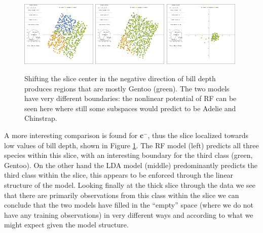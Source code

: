 \documentclass[]{interact}
\theoremstyle{plain}%
\theoremstyle{definition}
\theoremstyle{remark}
\begin{document}
\begin{figure}[ht]
\centerline{\includegraphics[width=0.32\textwidth]{figures/slice1_m_rf.png}
\includegraphics[width=0.32\textwidth]{figures/slice1_m_lda.png}
\includegraphics[width=0.32\textwidth]{figures/slice1_m_data.png}}
\caption{Shifting the slice center in the negative direction of bill depth produces regions that are mostly Gentoo (green). The two models have very different boundaries: the nonlinear potential of RF can be seen here where still some subspaces would predict to be Adelie and Chinstrap.}
\label{slice1m}
\end{figure}

A more interesting comparison is found for \(\mathbf{c}^{-}\), thus the
slice localized towards low values of bill depth, shown in Figure
\ref{slice1m}. The RF model (left) predicts all three species within
this slice, with an interesting boundary for the third class (green,
Gentoo). On the other hand the LDA model (middle) predominantly predicts
the third class within the slice, this appears to be enforced through
the linear structure of the model. Looking finally at the thick slice
through the data we see that there are primarily observations from this
class within the slice we can conclude that the two models have filled
in the ``empty'' space (where we do not have any training observations)
in very different ways and according to what we might expect given the
model structure.
\end{document}
